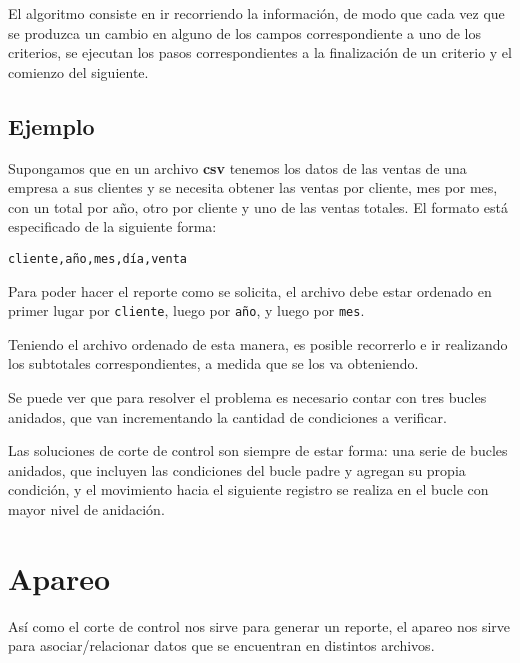 El algoritmo consiste en ir recorriendo la información, de modo que cada vez
que se produzca un cambio en alguno de los campos correspondiente a uno de los
criterios, se ejecutan los pasos correspondientes a la finalización de un
criterio y el comienzo del siguiente.

\subsection*{Ejemplo}

Supongamos que en un archivo \textbf{csv} tenemos los datos de las ventas de
una empresa a sus clientes y se necesita obtener las ventas por cliente,
mes por mes, con un total por año, otro por cliente y uno de las ventas
totales. El formato está especificado de la siguiente forma:

\begin{verbatim}
cliente,año,mes,día,venta
\end{verbatim}

Para poder hacer el reporte como se solicita, el archivo debe estar ordenado en
primer lugar por \verb!cliente!, luego por \verb!año!, y luego por \verb!mes!.

Teniendo el archivo ordenado de esta manera, es posible recorrerlo e ir
realizando los subtotales correspondientes, a medida que se los va
obteniendo.



Se puede ver que para resolver el problema es necesario contar con tres
bucles anidados, que van incrementando la cantidad de condiciones a
verificar.

\begin{observacion}
Las soluciones de corte de control son siempre de estar forma: una serie de
bucles anidados, que incluyen las condiciones del bucle padre y agregan su
propia condición, y el movimiento hacia el siguiente registro se realiza en
el bucle con mayor nivel de anidación.
\end{observacion}

\section{Apareo}

Así como el corte de control nos sirve para generar un reporte, el apareo nos
sirve para asociar/relacionar datos que se encuentran en distintos archivos.

